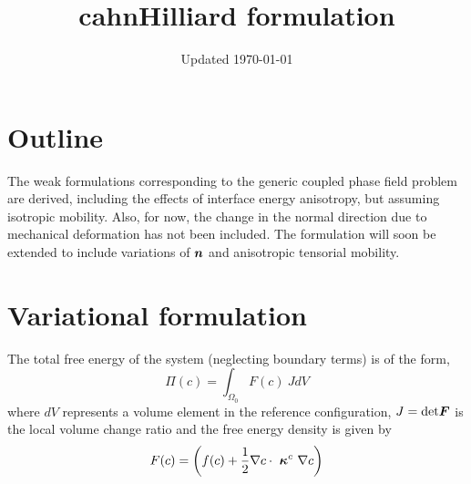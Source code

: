 


\makenomenclature 
\makeindex 

\title{cahnHilliard formulation}
\date{Updated \today} 

\maketitle
{}
\printnomenclature[1cm]
\vspace{.5in}

\section{Outline}
The weak formulations corresponding to the generic coupled phase field problem are derived, including the effects of interface energy anisotropy, but assuming isotropic mobility. Also, for now, the change in the normal direction due to mechanical deformation has not been included. The formulation will soon be extended to include variations of $\mbox{\boldmath$ n$}$ and anisotropic tensorial mobility.   
 
\section{Variational formulation}
The total free energy of the system (neglecting boundary terms) is of the form,
\begin{equation}
\Pi(c) = \int_{\Omega_0} F(c) ~J dV 
\end{equation}
where $dV$ represents a volume element in the reference configuration, $J= \text{det} \mbox{\boldmath$ F$}$ is the local volume change ratio and the free energy density is given by
\begin{equation}
 F(c) = \left(  f(c) + \frac{1}{2} \nabla  c  \cdot ~\mbox{\boldmath$\kappa$}^c ~\nabla  c\right)
\end{equation}

